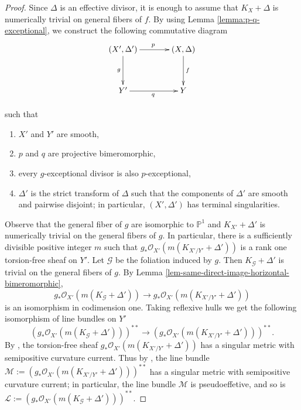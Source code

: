 \documentclass[12pt]{amsart}
\def\mbP{\mathbb{P}}
\newcommand{\<}{\leq}
\newcommand{\D}{\Delta}
\def\mcG{\mathcal{G}}
\def\msL{\mathscr{L}}
\def\msM{\mathscr{M}}
\theoremstyle{remark}
\theoremstyle{definition}
\theoremstyle{definition}
\numberwithin{equation}{section}
\theoremstyle{definition}
\theoremstyle{definition}
\begin{document}
\begin{proof}
Since $\Delta$ is an effective  divisor, it is enough to assume that $K_X+\Delta$ is numerically trivial on general fibers of $f$.   
By using Lemma \ref{lemma:p-q-exceptional},  we construct the following commutative diagram
\begin{equation}\label{eqn:terminal-reduction}
\xymatrixrowsep{3pc}\xymatrixcolsep{3pc}\xymatrix{
(X',\D')\ar[d]_{g} \ar[r]^p  & (X,\D) \ar[d]^{f} \\
 Y'\ar[r]_{q} & Y
}
\end{equation}

\noindent such that 
\begin{enumerate}
\item $X'$ and $Y'$ are smooth,
\item  $p$ and $q$ are projective bimeromorphic,
\item every $g$-exceptional divisor is also $p$-exceptional,
\item $\D'$ is the strict transform of $\D$ such that the components of $\Delta'$ are smooth and pairwise disjoint; in particular, $(X', \Delta')$ has terminal singularities.
\end{enumerate}
Observe that the general fiber of $g$ are isomorphic to $\mbP^1$ and $K_{X'}+\D'$ is numerically trivial on the general fibers of $g$.
In particular, there is a sufficiently divisible positive integer $m$ such that $g_*\mathcal{O}_{X'}(m(K_{X'/Y'}+ \D'))$ is a rank one torsion-free sheaf   on $Y'$.  
Let $\mcG$ be the foliation induced by $g$. 
Then $K_{\mcG}+\Delta'$ is trivial on the general fibers of $g$. By Lemma \ref{lem-same-direct-image-horizontal-bimeromorphic}, 
\begin{equation}
g_*\mathcal{O}_{X'}(m(K_{\mcG}+ \D')) \to  g_*\mathcal{O}_{X'}(m(K_{X'/Y'}+ \D'))
\end{equation}
is an isomorphism in codimension one. 
Taking reflexive hulls we get the following isomorphism of line bundles on $Y'$
\begin{equation}\label{eqn:isomorphism-in-codim-one}
    (g_*\mathcal{O}_{X'}(m(K_{\mcG}+ \D')))^{**} \to  (g_*\mathcal{O}_{X'}(m(K_{X'/Y'}+ \D')))^{**}.
 \end{equation}
By \cite[Corollary 5.2.1]{PT18}, the torsion-free sheaf $g_*\mathcal{O}_{X'}(m(K_{X'/Y'}+ \D'))$  has a singular metric with semipositive curvature current. Thus by \cite[Remark 2.4.2(3)]{PT18}, the line bundle $\msM:=(g_*\mathcal{O}_{X'}(m(K_{X'/Y'}+ \D')))^{**}$ has a singular metric with semipositive curvature current; in particular, the line bundle $\msM$ is pseudoeffetive,  and so is $\msL:=(g_*\mathcal{O}_{X'}(m(K_{\mcG}+ \D')))^{**}$. 


\end{proof}
\end{document}
